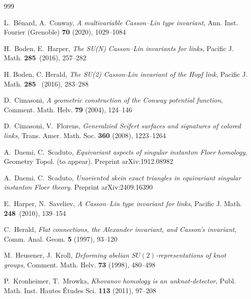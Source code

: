 \documentclass[11pt,reqno]{amsart}
\theoremstyle{definition}
\begin{document}
\begin{thebibliography}{999}


L.~B{\'e}nard, A.~Conway,
\emph{A multivariable Casson--Lin type invariant}, Ann. Inst. Fourier (Grenoble) \textbf{70} (2020), 1029--1084


H.~Boden, E.~Harper,
\emph{The SU(N) Casson--Lin invariants for links}, Pacific J. Math. \textbf{285}~(2016), 257--282

H. Boden, C. Herald, \emph{The SU(2) Casson-Lin invariant of the Hopf link}, Pacific J. Math. \textbf{285}~ (2016), 283--288

D.~Cimasoni,
\emph{A geometric construction of the Conway potential function}, Comment. Math. Helv. \textbf{79} (2004), 124--146

D.~Cimasoni, V.~Florens, 
\emph{Generalzied Seifert surfaces and signatures of colored links}, Trans. Amer. Math. Soc. \textbf{360} (2008), 1223--1264

A.~Daemi, C.~Scaduto,
\emph{Equivariant aspects of singular instanton Floer homology}, Geometry Topol. (to appear). Preprint arXiv:1912.08982

A.~Daemi, C.~Scaduto,
\emph{Unoriented skein exact triangles in equivariant singular instanton Floer theory}. Preprint arXiv:2409.16390

E.~Harper, N.~Saveliev,
\emph{A Casson--Lin type invariant for links}, Pacific J. Math. \textbf{248}~(2010), 139--154

C.~Herald,
\emph{Flat connections, the Alexander invariant, and Casson's invariant}, Comm. Anal. Geom. \textbf{5} (1997), 93--120

M.~Heusener, J.~Kroll,
\emph{Deforming abelian $SU(2)$-representations of knot groups}, Comment. Math. Helv. \textbf{73} (1998), 480--498

P.~Kronheimer, T.~Mrowka,
\emph{Khovanov homology is an unknot-detector}, Publ. Math. Inst. Hautes {\'E}tudes Sci. \textbf{113} (2011), 97--208


\end{thebibliography}
\end{document}
